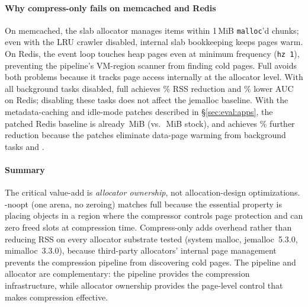 \paragraph{Why compress-only fails on memcached and Redis}
On memcached, the slab allocator manages items within 1\,MiB
\texttt{malloc}'d chunks; even with the LRU crawler disabled,
internal slab bookkeeping keeps pages warm.
On Redis, the event loop touches heap pages even at minimum
frequency (\texttt{hz\,1}), preventing the pipeline's VM-region
scanner from finding cold pages.
Full \sys avoids both problems because it tracks page access
internally at the allocator level.  With all background tasks
disabled, full \sys achieves \coRedisFullSmashReduction\% RSS
reduction and \aucRedisSmashRed\% lower AUC on Redis;
disabling these tasks does not affect the jemalloc baseline.
With the metadata-caching and idle-mode patches
described in \S\ref{sec:eval:apps}, the patched Redis baseline
is already \ablRedisPatchedBaselineServeRss\,MiB (vs.\
\ablRedisBaselineServeRss\,MiB stock), and \sys achieves
\ablRedisPatchedDefaultRssRedInt\% further reduction because the
patches eliminate data-page warming from background tasks
and .

\paragraph{Summary}
The critical value-add is \emph{allocator ownership}, not
allocation-design optimizations.
\sys-noopt (one arena, no zeroing) matches full \sys because the
essential property is placing objects in a region where the
compressor controls page protection and can zero freed slots at
compression time.
Compress-only adds overhead rather than reducing RSS on every
allocator substrate tested (system malloc, jemalloc~5.3.0,
mimalloc~3.3.0), because third-party allocators' internal page
management prevents the compression pipeline from discovering
cold pages.
The pipeline and allocator are complementary:
the pipeline provides the compression infrastructure, while
allocator ownership provides the page-level control that makes
compression effective.
